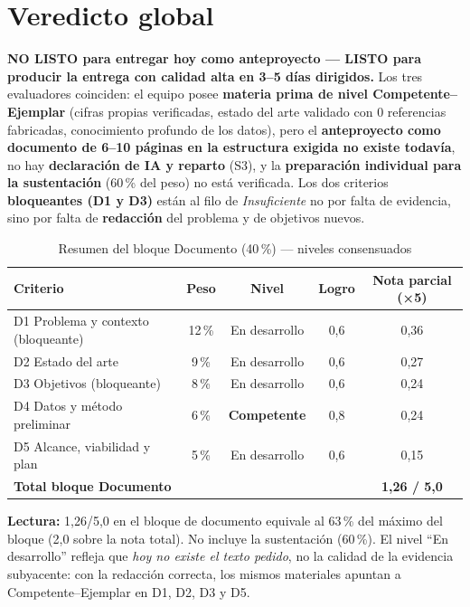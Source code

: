 \section{Veredicto global}

\begin{tcolorbox}[hallazgo]
\textbf{NO LISTO para entregar hoy como anteproyecto — LISTO para producir la
entrega con calidad alta en 3--5 días dirigidos.} Los tres evaluadores coinciden:
el equipo posee \textbf{materia prima de nivel Competente--Ejemplar} (cifras
propias verificadas, estado del arte validado con 0 referencias fabricadas,
conocimiento profundo de los datos), pero el \textbf{anteproyecto como documento
de 6--10 páginas en la estructura exigida no existe todavía}, no hay
\textbf{declaración de IA y reparto} (S3), y la \textbf{preparación individual
para la sustentación} (60\,\% del peso) no está verificada. Los dos criterios
\textbf{bloqueantes (D1 y D3)} están al filo de \emph{Insuficiente} no por falta
de evidencia, sino por falta de \textbf{redacción} del problema y de objetivos
nuevos.
\end{tcolorbox}

\begin{table}[htbp]
\centering
\caption{Resumen del bloque Documento (40\,\%) — niveles consensuados}
\label{tab:resumen}
\small
\begin{tabular}{lcccc}
\toprule
\textbf{Criterio} & \textbf{Peso} & \textbf{Nivel} & \textbf{Logro} & \textbf{Nota parcial (×5)} \\
\midrule
D1 Problema y contexto (bloqueante) & 12\,\% & En desarrollo & 0,6 & 0,36 \\
D2 Estado del arte & 9\,\% & En desarrollo & 0,6 & 0,27 \\
D3 Objetivos (bloqueante) & 8\,\% & En desarrollo & 0,6 & 0,24 \\
D4 Datos y método preliminar & 6\,\% & \textbf{Competente} & 0,8 & 0,24 \\
D5 Alcance, viabilidad y plan & 5\,\% & En desarrollo & 0,6 & 0,15 \\
\midrule
\multicolumn{4}{l}{\textbf{Total bloque Documento}} & \textbf{1,26 / 5,0} \\
\bottomrule
\end{tabular}
\end{table}

\begin{tcolorbox}[nota]
\textbf{Lectura:} 1,26/5,0 en el bloque de documento equivale al 63\,\% del
máximo del bloque (2,0 sobre la nota total). No incluye la sustentación
(60\,\%). El nivel ``En desarrollo'' refleja que \emph{hoy no existe el texto
pedido}, no la calidad de la evidencia subyacente: con la redacción correcta,
los mismos materiales apuntan a Competente--Ejemplar en D1, D2, D3 y D5.
\end{tcolorbox}

